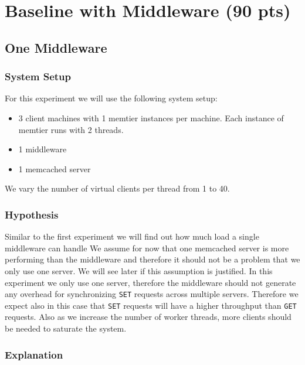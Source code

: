 \documentclass[11pt,a4paper]{article}
\begin{document}
\section{Baseline with Middleware (90 pts)}
%
\subsection{One Middleware}
%
\subsubsection{System Setup}
%
For this experiment we will use the following system setup:
%
\begin{itemize}
	\item 3 client machines with 1 memtier instances per machine. Each instance of memtier runs with 2 threads.
	\item 1 middleware
	\item 1 memcached server
\end{itemize}
%
We vary the number of virtual clients per thread from 1 to 40.
%
\subsubsection{Hypothesis}
%
Similar to the first experiment we will find out how much load a single middleware can handle
%
We assume for now that one memcached server is more performing than the middleware and therefore it should not be a problem that we only use one server.
%
We will see later if this assumption is justified.
%
In this experiment we only use one server, therefore the middleware should not generate any overhead for synchronizing \texttt{SET} requests across multiple servers.
%
Therefore we expect also in this case that \texttt{SET} requests will have a higher throughput than \texttt{GET} requests.
%
Also as we increase the number of worker threads, more clients should be needed to saturate the system.
%
\subsubsection{Explanation}\label{subsec:one_middleware_explanation}
%
\end{document}
